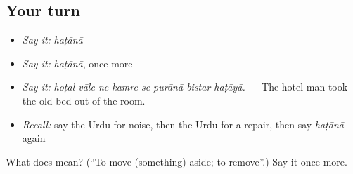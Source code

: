 \subsection*{Your turn}
\begin{itemize}
\raggedright
  \item \emph{Say it:} \emph{haṭānā}
  \item \emph{Say it:} \emph{haṭānā}, once more
  \item \emph{Say it:} \emph{hoṭal vāle ne kamre se purānā bistar haṭāyā.} — The hotel man took the old bed out of the room.
  \item \emph{Recall:} say the Urdu for noise, then the Urdu for a repair, then say \emph{haṭānā} again
\end{itemize}

\begin{tcolorbox}[breakable,colback=teal!4,colframe=teal!35!black,title={Before you move on}]
What does  mean? (\textquotedblleft{}To move (something) aside; to remove\textquotedblright{}.) Say it once more.
\end{tcolorbox}

